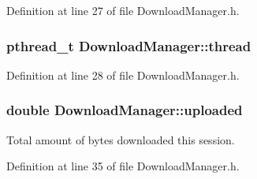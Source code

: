 Definition at line 27 of file DownloadManager.h.

\hypertarget{namespaceDownloadManager_a438b620345d580423549ba5e353643c9}{
\subsubsection[{thread}]{\setlength{\rightskip}{0pt plus 5cm}pthread\_\-t {\bf DownloadManager::thread}}}
\label{namespaceDownloadManager_a438b620345d580423549ba5e353643c9}


Definition at line 28 of file DownloadManager.h.

\hypertarget{namespaceDownloadManager_ac4190db8c08d26906ed2ea2d4e115794}{
\subsubsection[{uploaded}]{\setlength{\rightskip}{0pt plus 5cm}double {\bf DownloadManager::uploaded}}}
\label{namespaceDownloadManager_ac4190db8c08d26906ed2ea2d4e115794}


Total amount of bytes downloaded this session. 



Definition at line 35 of file DownloadManager.h.

